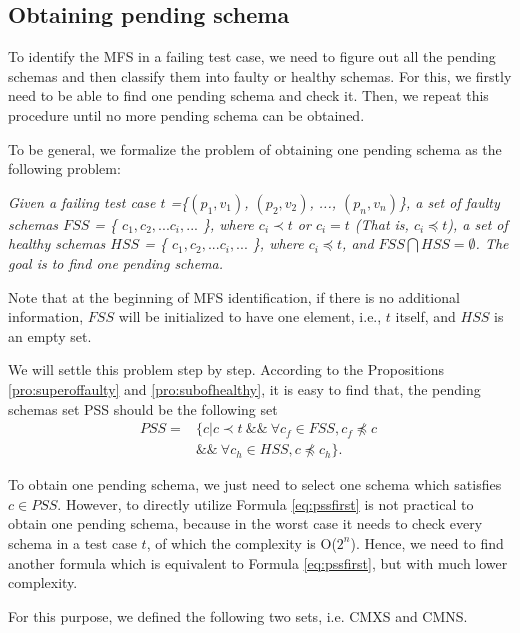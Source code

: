 \subsection{Obtaining pending schema}

To identify the MFS in a failing test case, we need to figure out all the pending schemas and then classify them into faulty or healthy schemas. For this, we firstly need to be able to find one pending schema and check it. Then, we repeat this procedure until no more pending schema can be obtained.

To be general, we formalize the problem of obtaining one pending schema as the following problem:

\emph{Given a failing test case $t$ =\{$(p_{1}, v_{1})$, $(p_{2}, v_{2})$, ..., $(p_{n}, v_{n})$\}, a set of faulty schemas $FSS$ = \{ $c_{1}, c_{2}, ... c_{i}, ...$ \}, where  $c_{i} \prec t$ or $c_{i} = t$ (That is, $c_{i} \preceq t $), a set of healthy schemas $HSS$ = \{ $c_{1}, c_{2}, ... c_{i}, ...$ \}, where  $c_{i} \preceq t$, and $FSS \bigcap HSS = \emptyset$. The goal is to find one pending schema.}

Note that at the beginning of MFS identification, if there is no additional information, $FSS$ will be initialized to have one element, i.e., $t$ itself, and $HSS$ is an empty set.

We will settle this problem step by step. According to the Propositions \ref{pro:superoffaulty} and \ref{pro:subofhealthy}, it is easy to find that, the pending schemas set PSS should be the following set \begin{equation}\begin{aligned}\label{eq:pssfirst}PSS=&\{ c | c \prec t\ \&\&\ \forall c_{f} \in FSS,  c_{f} \npreceq c\ \\ & \&\&\  \forall c_{h} \in HSS, c \npreceq c_{h} \} .\end{aligned} \end{equation}

To obtain one pending schema, we just need to select one schema which satisfies $ c \in PSS$. However, to directly utilize Formula \ref{eq:pssfirst} is not practical to obtain one pending schema, because in the worst case it needs to check every schema in a test case $t$, of which the complexity is O($2^{n}$). Hence, we need to find another formula which is equivalent to Formula \ref{eq:pssfirst}, but with much lower complexity.

For this purpose, we defined the following two sets, i.e. CMXS and CMNS.

